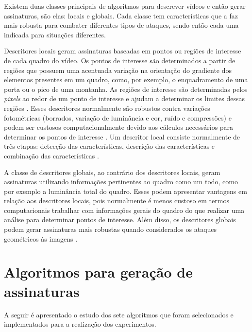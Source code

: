     Existem duas classes principais de algoritmos para descrever vídeos e então gerar assinaturas, são elas: locais e globais. Cada classe tem características que a faz mais robusta para combater diferentes tipos de ataques, sendo então cada uma indicada para situações diferentes.
    
    Descritores locais geram assinaturas baseadas em pontos ou regiões de interesse de cada quadro do vídeo. Os pontos de interesse são determinados a partir de regiões que possuem uma acentuada variação na orientação do gradiente dos elementos presentes em um quadro, como, por exemplo, o enquadramento de uma porta ou o pico de uma montanha. As regiões de interesse são determinadas pelos \textit{pixels} ao redor de um ponto de interesse e ajudam a determinar os limites dessas regiões \cite{radhakrishnan2007content}. Esses descritores normalmente são robustos contra variações fotométricas (borrados, variação de luminância e cor, ruído e compressões) e podem ser custosos computacionalmente devido aos cálculos necessários para determinar os pontos de interesse \cite{naini2014vanishing}. Um descritor local consiste normalmente de três etapas: detecção das características, descrição das características e combinação das características \cite{chen2010zernike}.

    A classe de descritores globais, ao contrário dos descritores locais, geram assinaturas utilizando informações pertinentes ao quadro como um todo, como por exemplo a luminância total do quadro. Esses podem apresentar vantagens em relação aos descritores locais, pois normalmente é menos custoso em termos computacionais trabalhar com informações gerais do quadro do que realizar uma análise para determinar pontos de interesse. Além disso, os descritores globais podem gerar assinaturas mais robustas quando considerados os ataques geométricos às imagens \cite{law2007video}. 
    
\section{Algoritmos para geração de assinaturas}

	
	A seguir é apresentado o estudo dos sete algoritmos que foram selecionados e implementados para a realização dos experimentos.


